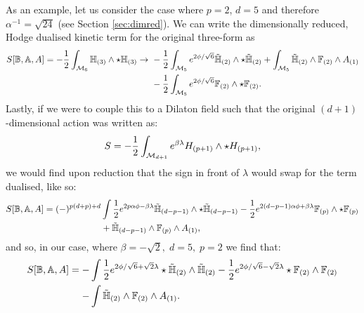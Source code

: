 As an example, let us consider the case where $p=2$, $d=5$ and therefore $\alpha^{-1} = \sqrt{24}$ (see Section \ref{sec:dimred}). We can write the dimensionally reduced, Hodge dualised kinetic term for the original three-form as
\begin{equation}
\begin{aligned}
	S[\mathbb{B}, \mathbb{A}, A] = - \frac{1}{2} \int_{\mathcal{M}_6}  \mathbb{H}_{(3)} \wedge \star \mathbb{H}_{(3)} \rightarrow \ & - \frac{1}{2} \int_{\mathcal{M}_5} e^{2\phi/ \sqrt{6}}  \tilde{\mathbb{H}}_{(2)} \wedge \star \tilde{\mathbb{H}}_{(2)} + \int_{\mathcal{M}_5} \tilde{\mathbb{H}}_{(2)} \wedge \mathbb{F}_{(2)} \wedge A_{(1)} \\
	& - \frac{1}{2} \int_{\mathcal{M}_5} e^{2\phi/ \sqrt{6}}  \mathbb{F}_{(2)} \wedge \star \mathbb{F}_{(2)}.
	\end{aligned}
\end{equation}
Lastly, if we were to couple this to a Dilaton field such that the original $(d+1)$-dimensional action was written as:
\begin{equation*}
	S = -\frac{1}{2} \int_{\mathcal{M}_{d+1}} e^{\beta \lambda} H_{(p+1)} \wedge \star H_{(p+1)},
\end{equation*}
we would find upon reduction that the sign in front of $\lambda$ would swap for the term dualised, like so:
\begin{equation}
\begin{aligned}
	S[\mathbb{B}, \mathbb{A}, A]= (-)^{p(d+p)+d} &\int \frac{1}{2} e^{2p\alpha \phi - \beta \lambda}  \tilde{\mathbb{H}}_{(d-p-1)} \wedge \star \tilde{\mathbb{H}}_{(d-p-1)} - \frac{1}{2} e^{2(d-p-1)\alpha \phi + \beta \lambda}  \mathbb{F}_{(p)} \wedge \star \mathbb{F}_{(p)} \\
	  &+ \tilde{\mathbb{H}}_{(d-p-1)} \wedge \mathbb{F}_{(p)} \wedge A_{(1)} ,
\end{aligned}
\end{equation}
and so, in our case, where $\beta = -\sqrt{2}, \; d=5, \; p=2$ we find that:
\begin{equation}
\begin{aligned}
	S[\mathbb{B}, \mathbb{A}, A]= - &\int \frac{1}{2} e^{2\phi / \sqrt{6} + \sqrt{2} \lambda} \star \tilde{\mathbb{H}}_{(2)} \wedge \tilde{\mathbb{H}}_{(2)} - \frac{1}{2} e^{2\phi / \sqrt{6} - \sqrt{2} \lambda} \star \mathbb{F}_{(2)} \wedge \mathbb{F}_{(2)} \\
	  - &\int \tilde{\mathbb{H}}_{(2)} \wedge \mathbb{F}_{(2)} \wedge A_{(1)}.
\end{aligned}
\end{equation}





